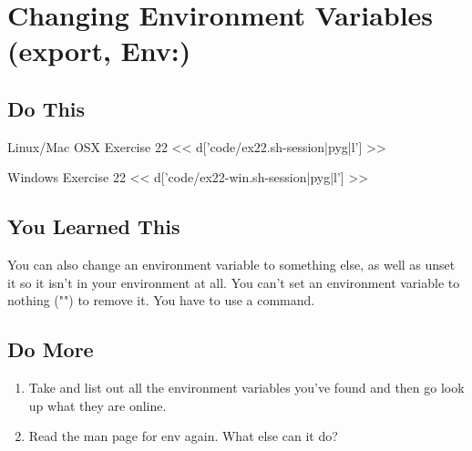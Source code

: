 \chapter{Changing Environment Variables (export, Env:)}

\section{Do This}

\begin{code}{Linux/Mac OSX Exercise 22}
<< d['code/ex22.sh-session|pyg|l'] >>
\end{code}

\begin{code}{Windows Exercise 22}
<< d['code/ex22-win.sh-session|pyg|l'] >>
\end{code}

\section{You Learned This}

You can also change an environment variable to something else, as well as
unset it so it isn't in your environment at all.  You can't set an
environment variable to nothing ("") to remove it.  You have to use a 
command.

\section{Do More}

\begin{enumerate}
\item Take and list out all the environment variables you've found and 
    then go look up what they are online.
\item Read the man page for env again.  What else can it do?
\end{enumerate}

